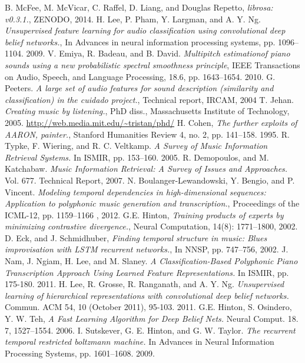 \documentclass[letterpaper, 10 pt, conference]{ieeeconf}
\begin{document}
\begin{thebibliography}{99}
 B. McFee, M. McVicar, C. Raffel, D. Liang, and Douglas Repetto, \textit{librosa: v0.3.1.}, ZENODO, 2014.
 H. Lee, P. Pham, Y. Largman, and A. Y. Ng. \textit{Unsupervised feature learning for audio classification using convolutional deep belief networks.}, In Advances in neural information processing systems, pp. 1096--1104. 2009.
 V. Emiya, R. Badeau, and B. David. \textit{Multipitch estimationof piano sounds using a new probabilistic spectral smoothness principle}, IEEE Transactions on Audio, Speech, and Language Processing, 18.6, pp. 1643--1654. 2010.
 G. Peeters. \textit{A large set of audio features for sound description (similarity and classification) in the cuidado project.}, Technical report, IRCAM, 2004
 T. Jehan. \textit{Creating music by listening.}, PhD diss., Massachusetts Institute of Technology, 2005. \url{http://web.media.mit.edu/~tristan/phd/}
 H. Cohen, \textit{The further exploits of AARON, painter.}, Stanford Humanities Review 4, no. 2, pp. 141--158. 1995.
 R. Typke, F. Wiering, and R. C. Veltkamp. \textit{A Survey of Music Information Retrieval Systems.} In ISMIR, pp. 153--160. 2005.
 R. Demopoulos, and M. Katchabaw. \textit{Music Information Retrieval: A Survey of Issues and Approaches.} Vol. 677. Technical Report, 2007.
  N. Boulanger-Lewandowski, Y. Bengio, and P. Vincent. \textit{Modeling temporal dependencies in high-dimensional sequences: Application to polyphonic music generation and transcription.}, Proceedings of the ICML-12, pp. 1159--1166 , 2012.
 G.E. Hinton, \textit{Training products of experts by minimizing contrastive divergence.}, Neural Computation, 14(8): 1771--1800, 2002.
 D. Eck, and J. Schmidhuber, \textit{Finding temporal structure in music: Blues improvisation with LSTM recurrent networks.}, In NNSP, pp. 747--756, 2002.
 J. Nam, J. Ngiam, H. Lee, and M. Slaney. \textit{A Classification-Based Polyphonic Piano Transcription Approach Using Learned Feature Representations.} In ISMIR, pp. 175-180. 2011.
 H. Lee, R. Grosse, R. Ranganath, and A. Y. Ng. \textit{Unsupervised learning of hierarchical representations with convolutional deep belief networks.} Commun. ACM 54, 10 (October 2011), 95-103. 2011.
 G.E. Hinton, S. Osindero, Y. W. Teh, \textit{A Fast Learning Algorithm for Deep Belief Nets.} Neural Comput. 18. 7, 1527--1554. 2006.
 I. Sutskever, G. E. Hinton, and G. W. Taylor. \textit{The recurrent temporal restricted boltzmann machine.} In Advances in Neural Information Processing Systems, pp. 1601--1608. 2009.
\end{thebibliography}
\end{document}
